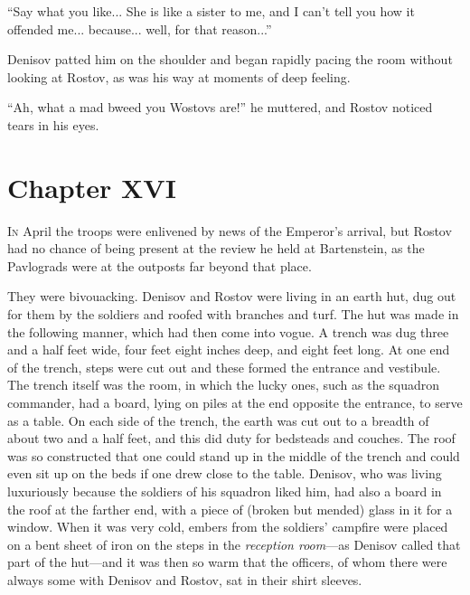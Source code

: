 ``Say what you like... She is like a sister to me, and I can't
tell you how it offended me... because... well, for that
reason...''

Denisov patted him on the shoulder and began rapidly pacing the
room without looking at Rostov, as was his way at moments of deep
feeling.

``Ah, what a mad bweed you Wostovs are!'' he muttered, and Rostov
noticed tears in his eyes.


\chapter*{Chapter XVI}
\ifaudio     
{} 
\fi

\lettrine[lines=2, loversize=0.3, lraise=0]{\initfamily I}{n}
April the troops were enlivened by news of the Emperor's
arrival, but Rostov had no chance of being present at the review
he held at Bartenstein, as the Pavlograds were at the outposts
far beyond that place.

They were bivouacking. Denisov and Rostov were living in an earth
hut, dug out for them by the soldiers and roofed with branches
and turf. The hut was made in the following manner, which had
then come into vogue. A trench was dug three and a half feet
wide, four feet eight inches deep, and eight feet long. At one
end of the trench, steps were cut out and these formed the
entrance and vestibule. The trench itself was the room, in which
the lucky ones, such as the squadron commander, had a board,
lying on piles at the end opposite the entrance, to serve as a
table. On each side of the trench, the earth was cut out to a
breadth of about two and a half feet, and this did duty for
bedsteads and couches. The roof was so constructed that one could
stand up in the middle of the trench and could even sit up on the
beds if one drew close to the table.  Denisov, who was living
luxuriously because the soldiers of his squadron liked him, had
also a board in the roof at the farther end, with a piece of
(broken but mended) glass in it for a window. When it was very
cold, embers from the soldiers' campfire were placed on a bent
sheet of iron on the steps in the \emph{reception room}---as Denisov
called that part of the hut---and it was then so warm that the
officers, of whom there were always some with Denisov and Rostov,
sat in their shirt sleeves.

